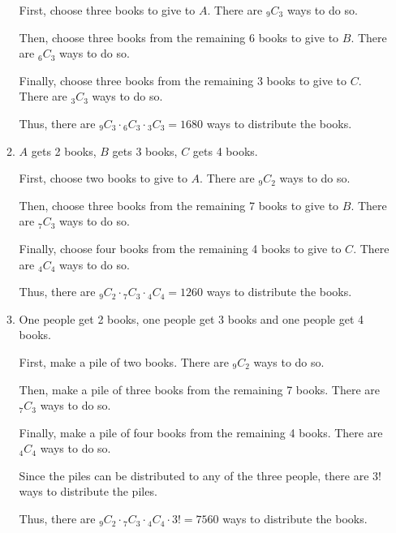 \documentclass{report}
\newcommand\comb[2][^n]{{}_{#1}C_{#2}}
\begin{document}
\begin{multicols}{2}
\begin{enumerate}
\begin{enumerate}
                  First, choose three books to give to $A$. There are $\comb[9]{3}$ ways to do
                  so.

                  Then, choose three books from the remaining 6 books to give to $B$. There are
                  $\comb[6]{3}$ ways to do so.

                  Finally, choose three books from the remaining 3 books to give to $C$. There
                  are $\comb[3]{3}$ ways to do so.

                  Thus, there are $\comb[9]{3} \cdot \comb[6]{3} \cdot \comb[3]{3} = 1680$ ways
                  to distribute the books.

            \item $A$ gets 2 books, $B$ gets 3 books, $C$ gets 4 books.
                  \sol{}

                  First, choose two books to give to $A$. There are $\comb[9]{2}$ ways to do so.

                  Then, choose three books from the remaining 7 books to give to $B$. There are
                  $\comb[7]{3}$ ways to do so.

                  Finally, choose four books from the remaining 4 books to give to $C$. There are
                  $\comb[4]{4}$ ways to do so.

                  Thus, there are $\comb[9]{2} \cdot \comb[7]{3} \cdot \comb[4]{4} = 1260$ ways
                  to distribute the books.

            \item One people get 2 books, one people get 3 books and one people get 4 books.
                  \sol{}

                  First, make a pile of two books. There are $\comb[9]{2}$ ways to do so.

                  Then, make a pile of three books from the remaining 7 books. There are
                  $\comb[7]{3}$ ways to do so.

                  Finally, make a pile of four books from the remaining 4 books. There are
                  $\comb[4]{4}$ ways to do so.

                  Since the piles can be distributed to any of the three people, there are $3!$
                  ways to distribute the piles.

                  Thus, there are $\comb[9]{2} \cdot \comb[7]{3} \cdot \comb[4]{4} \cdot 3! =
                    7560$ ways to distribute the books.


\end{enumerate}
\end{enumerate}
\end{multicols}
\end{document}
